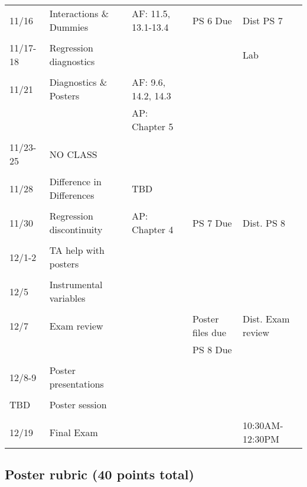 \documentclass[11pt]{article}
\begin{document}
\begin{small}
\begin{center}
\begin{tabular}{p{1.5cm} p{4cm} p{3.5cm} p{3cm} p{3cm}}
\\
 11/16 & Interactions \& Dummies & AF: 11.5, 13.1-13.4 & PS 6 Due  &
                                                                     Dist PS 7\\
\\ 
11/17-18 & Regression diagnostics &  &  & Lab \\
\\
11/21 & Diagnostics \& Posters &AF: 9.6, 14.2, 14.3 & & \\
& & AP: Chapter 5\\
\\
11/23-25 & NO CLASS\\
\\
11/28 & Difference in Differences &  TBD\\
\\
11/30 & Regression discontinuity & AP:  Chapter 4  & PS 7 Due  &
                                                           Dist. PS  8\\
\\
12/1-2 &  TA help with posters \\
\\
12/5 & Instrumental variables  &  \\
\\
12/7 & Exam review&  &  Poster files due & Dist. Exam review  \\
& & & PS 8 Due \\
\\
12/8-9 & Poster presentations \\
\\
TBD & Poster session \\
\\
12/19 & Final Exam & & & 10:30AM-12:30PM\\
\bottomrule
\end{tabular}


\end{center}
\end{small}



\subsection*{Poster rubric (40 points total)}
\end{document}

